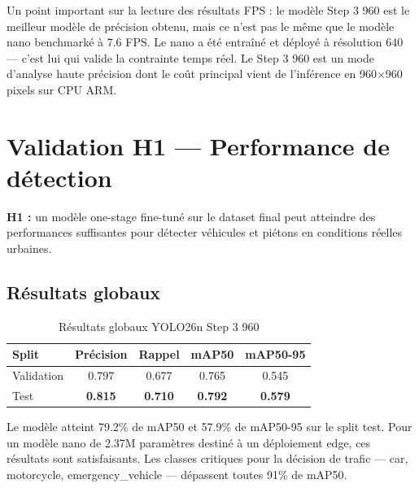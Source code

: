 Un point important sur la lecture des
résultats FPS : le modèle Step 3 960 est
le meilleur modèle de précision obtenu,
mais ce n'est pas le même que le modèle
nano benchmarké à 7.6 FPS. Le nano a été
entraîné et déployé à résolution 640 —
c'est lui qui valide la contrainte temps
réel. Le Step 3 960 est un mode d'analyse
haute précision dont le coût principal
vient de l'inférence en 960$\times$960
pixels sur CPU ARM.

\section{Validation H1 — Performance
         de détection}

\textbf{H1 :} un modèle one-stage fine-tuné
sur le dataset final peut atteindre des
performances suffisantes pour détecter
véhicules et piétons en conditions réelles
urbaines.

\subsection{Résultats globaux}

\begin{table}[H]
\centering
\caption{Résultats globaux YOLO26n
         Step 3 960}
\small
\begin{tabularx}{\textwidth}{Xcccc}
\toprule
\textbf{Split} &
\textbf{Précision} &
\textbf{Rappel} &
\textbf{mAP50} &
\textbf{mAP50-95} \\
\midrule
Validation &
0.797 & 0.677 & 0.765 & 0.545 \\
Test &
\textbf{0.815} & \textbf{0.710} &
\textbf{0.792} & \textbf{0.579} \\
\bottomrule
\end{tabularx}
\label{tab:global_results}
\end{table}

Le modèle atteint 79.2\% de mAP50 et
57.9\% de mAP50-95 sur le split test.
Pour un modèle nano de 2.37M paramètres
destiné à un déploiement edge, ces
résultats sont satisfaisants. Les classes
critiques pour la décision de trafic —
car, motorcycle, emergency\_vehicle —
dépassent toutes 91\% de mAP50.

